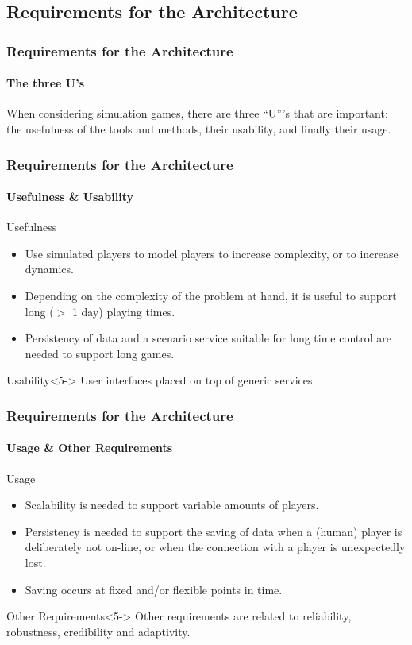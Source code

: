 \subsection{Requirements for the Architecture}

\begin{frame}
\frametitle{Requirements for the Architecture}
\framesubtitle{The three U's}
When considering simulation games, there are three ``U'''s
that are important: the \alert{usefulness} of the tools and methods, their
\alert{usability}, and finally their \alert{usage}.
\end{frame}

\begin{frame}
\frametitle{Requirements for the Architecture}
\framesubtitle{Usefulness \& Usability}
\begin{block}{Usefulness}
\begin{itemize}
\item <2->
Use simulated players to model players to increase complexity, or to increase
dynamics.
\item <3->
Depending on the complexity of the problem at hand,
it is useful to support long ($>$ 1 day) playing times.
\item <4->
Persistency of data and a
scenario service suitable for long time control are needed
to support long games.
\end{itemize}
\end{block}
\vfill
\begin{block}{Usability}<5->
User interfaces placed on top of generic services.
\end{block}
\end{frame}

\begin{frame}
\frametitle{Requirements for the Architecture}
\framesubtitle{Usage \& Other Requirements}
\begin{block}{Usage}
\begin{itemize}
\item <2->
\alert{Scalability} is needed to support variable amounts of players.
\item <3->
\alert{Persistency} is needed to support the saving of data
when a (human) player is deliberately not on-line, or when
the connection with a player is unexpectedly lost.
\item <4->
Saving occurs at fixed and/or flexible points in time.
\end{itemize}
\end{block}
\begin{block}{Other Requirements}<5->
Other requirements are related to \alert{reliability}, \alert{robustness},
credibility and adaptivity.
\end{block}
\end{frame}

